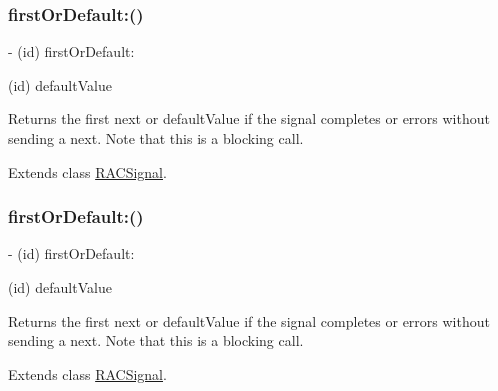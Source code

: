 \subsubsection{\texorpdfstring{first\+Or\+Default\+:()}{firstOrDefault:()}\hspace{0.1cm}{\footnotesize\ttfamily [2/3]}}
{\footnotesize\ttfamily -\/ (id) first\+Or\+Default\+: \begin{DoxyParamCaption}\item[{(id)}]{default\+Value }\end{DoxyParamCaption}}

Returns the first {\ttfamily next} or {\ttfamily default\+Value} if the signal completes or errors without sending a {\ttfamily next}. Note that this is a blocking call. 

Extends class \mbox{\hyperlink{interface_r_a_c_signal_a51f980781f2dc9e662278d7db7b0cd38}{R\+A\+C\+Signal}}.

\mbox{\label{category_r_a_c_signal_07_operations_08_a51f980781f2dc9e662278d7db7b0cd38}} 
\subsubsection{\texorpdfstring{first\+Or\+Default\+:()}{firstOrDefault:()}\hspace{0.1cm}{\footnotesize\ttfamily [3/3]}}
{\footnotesize\ttfamily -\/ (id) first\+Or\+Default\+: \begin{DoxyParamCaption}\item[{(id)}]{default\+Value }\end{DoxyParamCaption}}

Returns the first {\ttfamily next} or {\ttfamily default\+Value} if the signal completes or errors without sending a {\ttfamily next}. Note that this is a blocking call. 

Extends class \mbox{\hyperlink{interface_r_a_c_signal_a51f980781f2dc9e662278d7db7b0cd38}{R\+A\+C\+Signal}}.

\mbox{\label{category_r_a_c_signal_07_operations_08_a12b765a16842e9c7aa1d13b00d8df09b}} 
